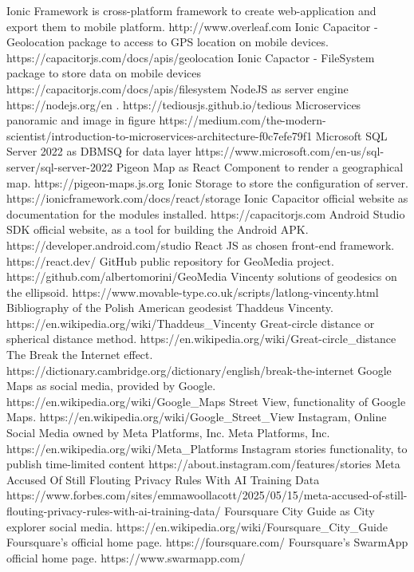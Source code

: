 \documentclass[conference]{IEEEtran}
\begin{document}
\begin{thebibliography}{00}
 Ionic Framework is cross-platform framework to create web-application and export them to mobile platform. http://www.overleaf.com
 Ionic Capacitor - Geolocation package to access to GPS location on mobile devices. https://capacitorjs.com/docs/apis/geolocation
Ionic Capactor - FileSystem package to store data on mobile devices https://capacitorjs.com/docs/apis/filesystem
 NodeJS as server engine https://nodejs.org/en
. https://tediousjs.github.io/tedious
 Microservices panoramic and image in figure https://medium.com/the-modern-scientist/introduction-to-microservices-architecture-f0c7efe79f1
 Microsoft SQL Server 2022 as DBMSQ for data layer https://www.microsoft.com/en-us/sql-server/sql-server-2022
 Pigeon Map as React Component to render a geographical map. https://pigeon-maps.js.org
Ionic Storage to store the configuration of server. https://ionicframework.com/docs/react/storage
Ionic Capacitor official website as documentation for the modules installed. https://capacitorjs.com
Android Studio SDK official website, as a tool for building the Android APK. https://developer.android.com/studio
React JS as chosen front-end framework. https://react.dev/
GitHub public repository for GeoMedia project. https://github.com/albertomorini/GeoMedia
 Vincenty solutions of geodesics on the ellipsoid. 
https://www.movable-type.co.uk/scripts/latlong-vincenty.html
 Bibliography of the Polish American geodesist Thaddeus Vincenty. https://en.wikipedia.org/wiki/Thaddeus\_Vincenty
Great-circle distance or spherical distance method.
https://en.wikipedia.org/wiki/Great-circle\_distance
 The Break the Internet effect. 
https://dictionary.cambridge.org/dictionary/english/break-the-internet
 Google Maps as social media, provided by Google. https://en.wikipedia.org/wiki/Google\_Maps
 Street View, functionality of Google Maps.
https://en.wikipedia.org/wiki/Google\_Street\_View
 Instagram, Online Social Media owned by Meta Platforms, Inc.
 Meta Platforms, Inc.
https://en.wikipedia.org/wiki/Meta\_Platforms
 Instagram stories functionality, to publish time-limited content
https://about.instagram.com/features/stories
Meta Accused Of Still Flouting Privacy Rules With AI Training Data
https://www.forbes.com/sites/emmawoollacott/2025/05/15/meta-accused-of-still-flouting-privacy-rules-with-ai-training-data/
 Foursquare City Guide as City explorer social media.
https://en.wikipedia.org/wiki/Foursquare\_City\_Guide
 Foursquare's official home page.
https://foursquare.com/
 Foursquare's SwarmApp official home page.
https://www.swarmapp.com/
\end{thebibliography}

\vspace{12pt}
\end{document}
